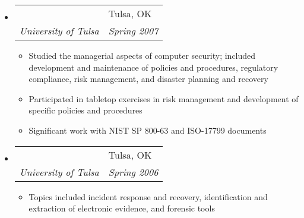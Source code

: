 \documentclass[letterpaper,11pt]{article}
\makeatletter
\newcommand{\resitem}[1]{\item \parbox[t]{4.6in}{#1} \vspace{-2pt}}
\newcommand{\ressubheading}[4]{
\begin{tabular*}{6.5in}[t]{l@{\extracolsep{\fill}}l}
		\textbf{\parbox[t]{4.5in}{\raggedright #1 }} & \parbox[b]{1.5in}{#2} \\
		\textit{#3} & \textit{#4} \\
\end{tabular*}\vspace{-6pt}}
\makeatother
\begin{document}
\begin{itemize}
\item
	\ressubheading{Enterprise Security Management}{Tulsa, OK}{University of Tulsa}{Spring 2007}
	\begin{itemize}
		\resitem{Studied the managerial aspects of computer security; included development and maintenance of policies and procedures, regulatory compliance, risk management, and disaster planning and recovery}
		\resitem{Participated in tabletop exercises in risk management and development of specific policies and procedures}
		\resitem{Significant work with NIST SP 800-63 and ISO-17799 documents}
	\end{itemize}
\item
	\ressubheading{Computer Forensics}{Tulsa, OK}{University of Tulsa}{Spring 2006}
	\begin{itemize}
		\resitem{Topics included incident response and recovery, identification and extraction of electronic evidence, and forensic tools}
	\end{itemize}
\end{itemize}
\end{document}
